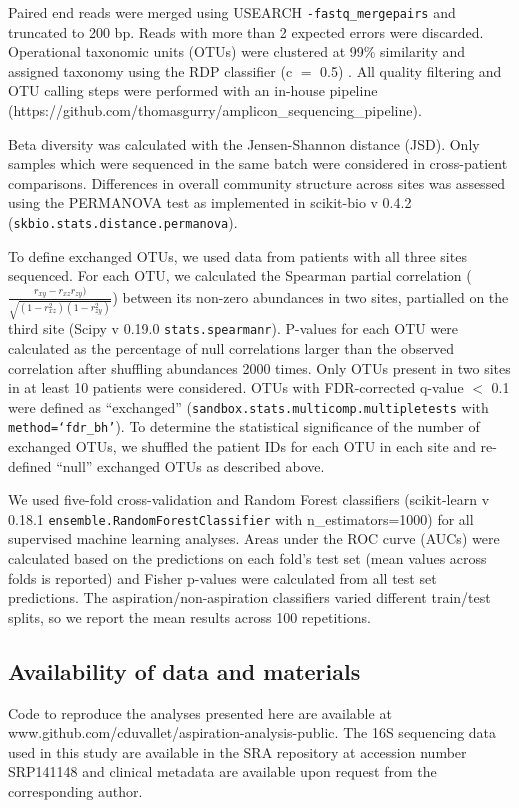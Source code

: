 \documentclass{article}
\begin{document}
Paired end reads were merged using USEARCH \texttt{-fastq\_mergepairs} and truncated to 200 bp.
Reads with more than 2 expected errors were discarded. 
Operational taxonomic units (OTUs) were clustered at 99\% similarity and assigned taxonomy using the RDP classifier (c $=$ 0.5) \cite{wang2007rdp}.
All quality filtering and OTU calling steps were performed with an in-house pipeline \\ (https://github.com/thomasgurry/amplicon\_sequencing\_pipeline).

Beta diversity was calculated with the Jensen-Shannon distance (JSD).
Only samples which were sequenced in the same batch were considered in cross-patient comparisons.
Differences in overall community structure across sites was assessed using the PERMANOVA test as implemented in scikit-bio v 0.4.2 (\texttt{skbio.stats.distance.permanova}).

To define exchanged OTUs, we used data from patients with all three sites sequenced.
For each OTU, we calculated the Spearman partial correlation ($\frac{r_{xy} - r_{xz}r_{zy})}{\sqrt{(1 - r_{xz}^2)(1 - r_{zy}^2)}}$) between its non-zero abundances in two sites, partialled on the third site (Scipy v 0.19.0 \texttt{stats.spearmanr}).
P-values for each OTU were calculated as the percentage of null correlations larger than the observed correlation after shuffling abundances 2000 times.
Only OTUs present in two sites in at least 10 patients were considered.
OTUs with FDR-corrected q-value $<$ 0.1 were defined as ``exchanged'' (\texttt{sandbox.stats.multicomp.multipletests} with \texttt{method=`fdr\_bh'}).
To determine the statistical significance of the number of exchanged OTUs, we shuffled the patient IDs for each OTU in each site and re-defined ``null'' exchanged OTUs as described above.

We used five-fold cross-validation and Random Forest classifiers (scikit-learn v 0.18.1 \newline \texttt{ensemble.RandomForestClassifier} with n\_estimators=1000) for all supervised machine learning analyses.
Areas under the ROC curve (AUCs) were calculated based on the predictions on each fold's test set (mean values across folds is reported) and Fisher p-values were calculated from all test set predictions.
The aspiration/non-aspiration classifiers varied different train/test splits, so we report the mean results across 100 repetitions.

\subsection{Availability of data and materials}
Code to reproduce the analyses presented here are available at www.github.com/cduvallet/aspiration-analysis-public. 
The 16S sequencing data used in this study are available in the SRA repository at accession number SRP141148 and clinical metadata are available upon request from the corresponding author.
\end{document}
